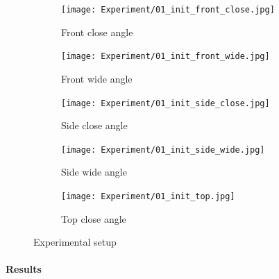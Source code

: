 \begin{figure}[H]

\begin{subfigure}{0.30\textwidth}
\texttt{[image: Experiment/01\_init\_front\_close.jpg]}
\caption{Front close angle} \label{fig:01_init_front_close}
\end{subfigure}\hspace*{\fill}
\begin{subfigure}{0.30\textwidth}
\texttt{[image: Experiment/01\_init\_front\_wide.jpg]}
\caption{Front wide angle} \label{fig:01_init_front_wide}
\end{subfigure}\hspace*{\fill}
\begin{subfigure}{0.30\textwidth}
\texttt{[image: Experiment/01\_init\_side\_close.jpg]}
\caption{Side close angle} \label{fig:01_init_side_close}
\end{subfigure}

\medskip

\begin{subfigure}{0.48\textwidth}
\texttt{[image: Experiment/01\_init\_side\_wide.jpg]}
\caption{Side wide angle} \label{fig:01_init_side_wide}
\end{subfigure}\hspace*{\fill}
\begin{subfigure}{0.48\textwidth}
\texttt{[image: Experiment/01\_init\_top.jpg]}
\caption{Top close angle} \label{fig:01_init_top}
\end{subfigure}

\caption{Experimental setup} \label{fig:experimental_setup}
\end{figure}

\clearpage

\paragraph{Results}

